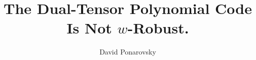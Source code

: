 \documentclass[manuscript,screen,review]{acmart}
\begin{document}
\newcommand{\commentt}[1]{\textcolor{blue}{ \textbf{[COMMENT]} #1}}
\newcommand{\ctt}[1]{\commentt{#1}}
\newcommand{\prb}[1]{ \mathbf{Pr} \left[ {#1} \right]}
\newcommand{\expp}[1]{ \mathbf{E} \left[ {#1} \right]  }
\newcommand{\onotation}[1]{\(\mathcal{O} \left( {#1}  \right) \)}
\newcommand{\ona}[1]{\onotation{#1}}
\newcommand{\Cpa}{[n, \rho n, \delta n]}
\newcommand{\Jvv}{ \bar{J_{v}} } 
\newcommand{\Cvv}{ \tilde{C_{v}} } 

\newcommand{\Gz}{ G_{z}^{\delta} } 
\newcommand{ \Tann } {  \mathcal{T}\left( G, C_0 \right) }
\newcommand{\ireducable}{ireducable \hyperref[ire]{[\ref{ire}]} }
\newcommand{\cutUU}{E(U_{-1} \bigcup U_{+1} ,U)} 
\newcommand{\wcutUU}{w\left( E(U_{-1} \bigcup U_{+1} ,U)  \right)}
\newcommand{\testgo}{  \mathcal{T}\left(J, q , C_{0}\right) } 

\newcommand{\duC}{\left( C_{A}^{\perp}\otimes C_{B}^{\perp} \right)^{\perp}}
\newcommand{\duduC}{\left( C_{A}\otimes C_{B}\right)^{\perp}}
\title{The Dual-Tensor Polynomial Code Is Not $w$-Robust. } 
\author{David Ponarovsky}
\end{document}
